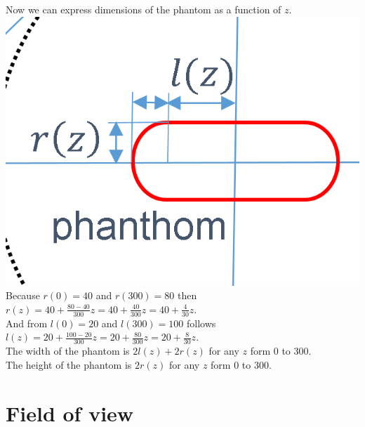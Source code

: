 \documentclass[12pt]{article}
\begin{document}
Now we can express dimensions of the phantom as a function of $z$.\\
\includegraphics[scale=0.5]{pic01a.png}\\
Because $r(0)=40$ and $r(300)=80$ then $r(z)=40+\frac{80-40}{300}z=40+\frac{40}{300}z=40+\frac{4}{30}z$.\\
And from $l(0)=20$ and $l(300)=100$ follows $l(z)=20+\frac{100-20}{300}z=20+\frac{80}{300}z=20+\frac{8}{30}z$.\\

The width of the phantom is $2l(z)+2r(z)$ for any $z$ form 0 to 300.\\ 
The height of the phantom is $2r(z)$ for any $z$ form 0 to 300. \\
\section{Field of view}
\end{document}
